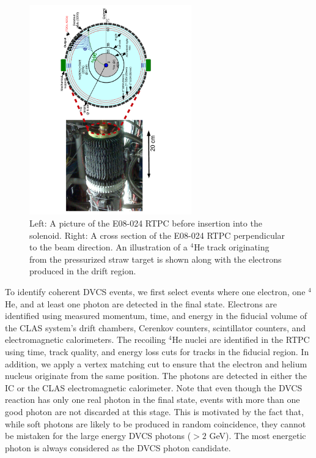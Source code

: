 \documentclass[twocolumn,nofootinbib,showpacs,prl,superscriptaddress,secnumarabic,amssymb,nobibnotes,aps,floatfix]{revtex4}
\begin{document}
\begin{figure}[tb]
\vspace{-1.1cm}
\includegraphics[width=7.0cm,angle=-90]{figs/RTPC.pdf}
\vspace{-1.1cm}
\caption{Left: A picture of the E08-024 RTPC before insertion into the 
   solenoid. Right: A cross section of the E08-024 RTPC perpendicular to the 
   beam direction. An illustration of a $^4$He track originating from the 
   pressurized straw target is shown along with the electrons produced in the 
   drift region.}
\label{fig:RTPC}
\end{figure}

To identify coherent DVCS events, we first select events where one 
electron, one $^4$He, and at least one photon are detected in the final state.
Electrons are identified using measured momentum, time, and energy in the fiducial 
volume of the CLAS system's drift chambers, Cerenkov counters, scintillator counters, and 
electromagnetic calorimeters. The recoiling $^4$He nuclei are identified in the RTPC using time, 
track quality, and energy loss cuts for tracks in the fiducial region. In 
addition, we apply a vertex matching cut to ensure that the electron and helium
nucleus originate from the same position. The photons are detected in either
the IC or the CLAS electromagnetic calorimeter. Note that even though the DVCS 
reaction has only one real photon in the final state, events with more than one 
good photon are not discarded at this stage. This is motivated by the fact 
that, while soft photons are likely to be produced in random coincidence, they 
cannot be mistaken for the large energy DVCS photons ($>2$ GeV).
The most energetic photon is always considered as the DVCS photon candidate.
\end{document}
